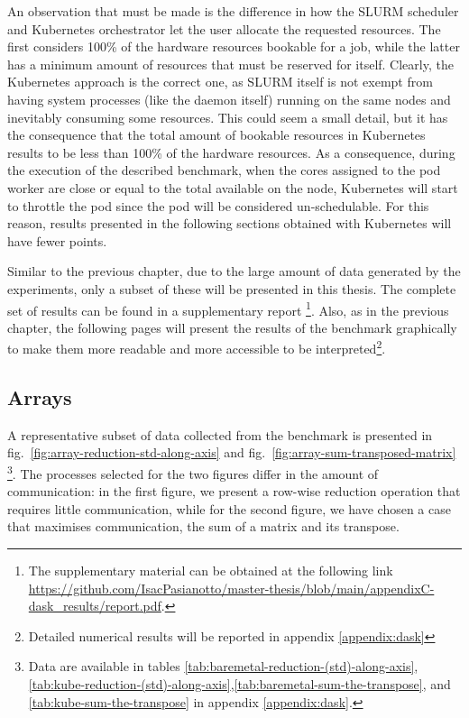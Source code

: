 An observation that must be made is the difference in how the SLURM scheduler
and Kubernetes orchestrator let the user allocate the requested resources.
The first considers 100\% of the hardware resources bookable for a job, while
the latter has a minimum amount of resources that must be reserved for itself.
Clearly, the Kubernetes approach is the correct one, as SLURM itself is not
exempt from having system processes (like the daemon itself) running on the same
nodes and inevitably consuming some resources.
This could seem a small detail, but it has the consequence that the total amount
of bookable resources in Kubernetes results to be less than 100\% of the
hardware resources.
As a consequence, during the execution of the described benchmark, when the
cores assigned to the pod worker are close or equal to the total available on
the node, Kubernetes will start to throttle the pod since the pod will be
considered un-schedulable.
For this reason, results presented in the following sections obtained with
Kubernetes will have fewer points.

Similar to the previous chapter, due to the large amount of data generated by
the experiments, only a subset of these will be presented in this thesis.
The complete set of results can be found in a supplementary report \footnote {
  The supplementary material can be obtained at the following link
  \url{https://github.com/IsacPasianotto/master-thesis/blob/main/appendixC-dask_results/report.pdf}.}.
Also, as in the previous chapter, the following pages will present the results
of the benchmark graphically to make them more readable and more accessible to
be interpreted\footnote{Detailed numerical results will be reported in appendix
\ref{appendix:dask}}.

\subsection{Arrays}

A representative subset of data collected from the benchmark is presented in
fig.~\ref{fig:array-reduction-std-along-axis} and
fig.~\ref{fig:array-sum-transposed-matrix} \footnote{
  Data are available in tables
  \ref{tab:baremetal-reduction-(std)-along-axis},\ref{tab:kube-reduction-(std)-along-axis},\ref{tab:baremetal-sum-the-transpose},
  and \ref{tab:kube-sum-the-transpose} in appendix \ref{appendix:dask}.
}.
The processes selected for the two figures differ in the amount of
communication: in the first figure, we present a row-wise reduction operation
that requires little communication, while for the second figure, we have chosen
a case that maximises communication, the sum of a matrix and its transpose.

